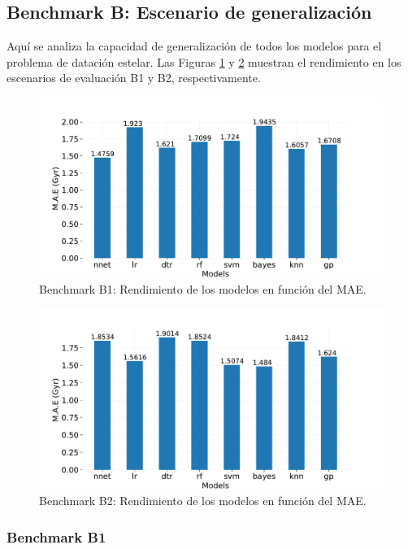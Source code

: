 \subsection{Benchmark B: Escenario de generalización}

Aquí se analiza la capacidad de generalización de todos los modelos para el problema de datación estelar. Las Figuras \ref{fig:benchB1} y \ref{fig:benchB2} muestran el rendimiento en los escenarios de evaluación B1 y B2, respectivamente.

\begin{figure}[H]
\begin{center}
 \includegraphics[width=0.8\linewidth]{Figuras/Experimentos/B_B1_models.pdf}
\end{center}
\caption{Benchmark B1: Rendimiento de los modelos en función del MAE.}
 \label{fig:benchB1}
\end{figure}

\begin{figure}[H]
\begin{center}
 \includegraphics[width=0.8\linewidth]{Figuras/Experimentos/B_B2_models.pdf}
\end{center}
\caption{Benchmark B2: Rendimiento de los modelos en función del MAE.}
 \label{fig:benchB2}
\end{figure}

\subsubsection{Benchmark B1} 

